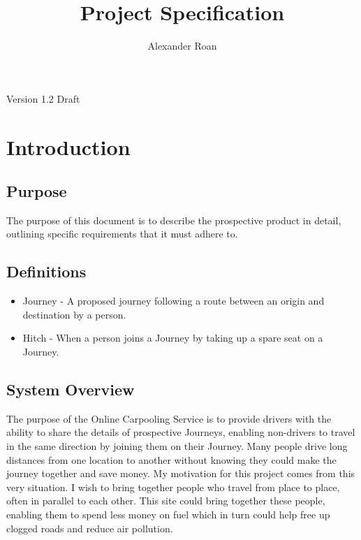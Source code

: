 \documentclass[11pt]{article}
\begin{document}
\begin{titlepage}
\title{Project Specification}
\author{Alexander Roan}
\maketitle
\begin{center}
Version 1.2 Draft
\end{center}
\end{titlepage}

\tableofcontents
\newpage
\section{Introduction}

\subsection{Purpose}
The purpose of this document is to describe the prospective product in detail, outlining specific requirements that it must adhere to.

\subsection{Definitions}
\begin{itemize}
\item Journey - A proposed journey following a route between an origin and destination by a person.
\item Hitch - When a person joins a Journey by taking up a spare seat on a Journey.
\end{itemize}

\subsection{System Overview}
The purpose of the Online Carpooling Service is to provide drivers with the ability to share the details of prospective Journeys, enabling non-drivers to travel in the same direction by joining them on their Journey. Many people drive long distances from one location to another without knowing they could make the journey together and save money. My motivation for this project comes from this very situation. I wish to bring together people who travel from place to place, often in parallel to each other. This site could bring together these people, enabling them to spend less money on fuel which in turn could help free up clogged roads and reduce air pollution.
\end{document}
